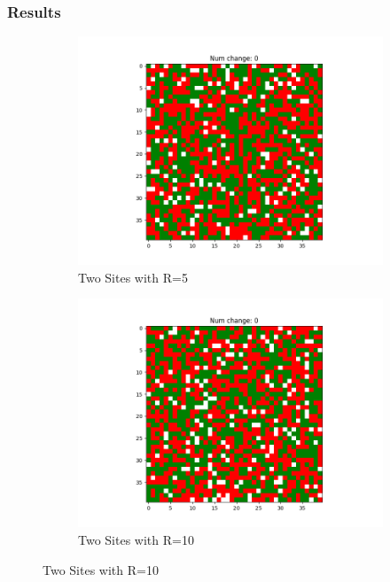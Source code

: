 \documentclass[11pt]{article}
\begin{document}
	\subsubsection{Results}
	\begin{figure}[h]
		\centering
		\begin{subfigure}{0.14\textwidth}
			\includegraphics[width=\linewidth]{policy3_initial_h2r5.png}
			\caption{\centering Two Sites with R=5}
		\end{subfigure}\hfill
		\begin{subfigure}{0.14\textwidth}
			\includegraphics[width=\linewidth]{policy3_initial_h2r10.png}
			\caption{\centering Two Sites with R=10}
		\end{subfigure}\hfill

\end{figure}
\end{document}
